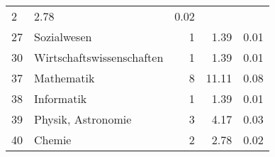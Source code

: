 \begin{longtable}{lXrrr}
       \num{2} &
       \num[round-mode=places,round-precision=2]{2.78} &
         \num[round-mode=places,round-precision=2]{0.02} \\

     27 &
     \multicolumn{1}{X}{ Sozialwesen   } &


       \num{1} &
       \num[round-mode=places,round-precision=2]{1.39} &
         \num[round-mode=places,round-precision=2]{0.01} \\

     30 &
     \multicolumn{1}{X}{ Wirtschaftswissenschaften   } &


       \num{1} &
       \num[round-mode=places,round-precision=2]{1.39} &
         \num[round-mode=places,round-precision=2]{0.01} \\

     37 &
     \multicolumn{1}{X}{ Mathematik   } &


       \num{8} &
       \num[round-mode=places,round-precision=2]{11.11} &
         \num[round-mode=places,round-precision=2]{0.08} \\

     38 &
     \multicolumn{1}{X}{ Informatik   } &


       \num{1} &
       \num[round-mode=places,round-precision=2]{1.39} &
         \num[round-mode=places,round-precision=2]{0.01} \\

     39 &
     \multicolumn{1}{X}{ Physik, Astronomie   } &


       \num{3} &
       \num[round-mode=places,round-precision=2]{4.17} &
         \num[round-mode=places,round-precision=2]{0.03} \\

     40 &
     \multicolumn{1}{X}{ Chemie   } &


       \num{2} &
       \num[round-mode=places,round-precision=2]{2.78} &
         \num[round-mode=places,round-precision=2]{0.02} \\


\end{longtable}
